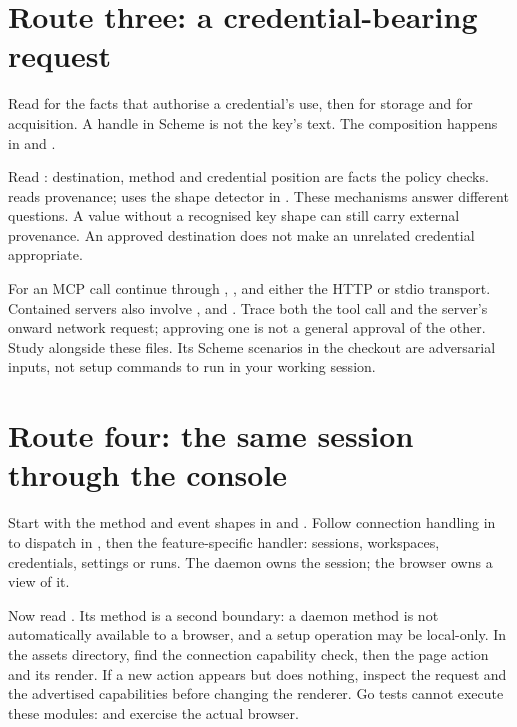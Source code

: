 \section{Route three: a credential-bearing request}

Read  for the facts that authorise a
credential's use, then  for storage and
 for acquisition. A handle in Scheme is
not the key's text. The composition happens in
 and .

Read : destination, method and credential
position are facts the policy checks.  reads
provenance;  uses the shape detector in
. These mechanisms answer different questions.
A value without a recognised key shape can still carry external provenance.
An approved destination does not make an unrelated credential appropriate.

For an MCP call continue through ,
, and either the HTTP or stdio transport.
Contained servers also involve ,
 and .
Trace both the tool call and the server's onward network request; approving
one is not a general approval of the other. Study 
alongside these files. Its Scheme scenarios in the checkout
are adversarial inputs, not setup commands to run in your working session.

\section{Route four: the same session through the console}

Start with the method and event shapes in
 and
. Follow connection handling in
 to dispatch in
, then the feature-specific handler:
sessions, workspaces, credentials, settings or runs. The daemon owns the
session; the browser owns a view of it.

Now read . Its  method
is a second boundary: a daemon method is not automatically available to a
browser, and a setup operation may be local-only. In the assets directory,
find the connection capability check, then the page action and its render.
If a new action appears but does nothing, inspect the request and the
advertised capabilities before changing the renderer. Go tests cannot
execute these modules:  and
 exercise the actual browser.

